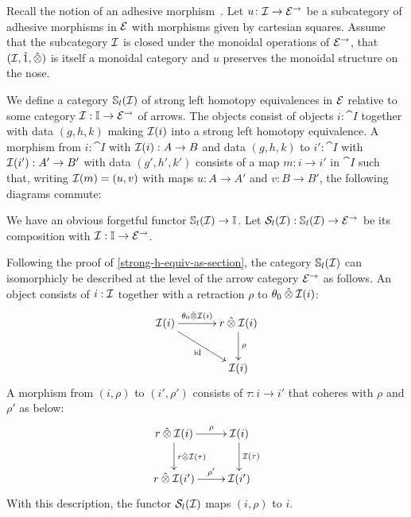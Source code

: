 \documentclass[reqno,10pt,a4paper,oneside]{amsart}
\begin{document}
Recall the notion of an adhesive morphism~\cite{garner-lack:adhesive}.  Let $u \co \cal{I} \to \catE^{\to}$ be a subcategory of adhesive morphisms in $\catE$ with morphisms given by cartesian squares. Assume that the subcategory $\cal{I}$ is closed under the monoidal operations of $\catE^{\to}$, \ie that $(\cal{I}, \hatunit, \hatotimes)$ is itself a monoidal category and $u$ preserves the monoidal structure on the nose. 

\newpage


\begin{definition}
We define a category $\cat{S}_l(\cal{I})$ of strong left homotopy equivalences in $\catE$ relative to some category $\cal{I} : \cat{I} \to \catE^{\to}$ of arrows.
The objects consist of objects $i : \cat{I}$ together with data $(g, h, k)$ making $\cal{I}(i)$ into a strong left homotopy equivalence.
A morphism from $i : \cat{I}$ with $\cal{I}(i) : A \to B$ and data $(g, h, k)$ to $i' : \cat{I}$ with $\cal{I}(i') : A' \to B'$ with data $(g', h', k')$ consists of a map $m : i \to i'$ in $\cat{I}$ such that, writing $\cal{I}(m) = (u, v)$ with maps $u : A \to A'$ and $v : B \to B'$, the following diagrams commute:

We have an obvious forgetful functor $\cat{S}_l(\cal{I}) \to \cat{I}$.
Let $\cal{S}_l(\cal{I}) : \cat{S}_l(\cal{I}) \to \catE^{\to}$ be its composition with $\cal{I} : \cat{I} \to \catE^{\to}$.
\end{definition}

\begin{remark}
\label{strong-h-equiv-as-section-algebraic}
Following the proof of \cref{strong-h-equiv-as-section}, the category $\cat{S}_l(\cal{I})$ can isomorphicly be described at the level of the arrow category $\catE^{\to}$ as follows.
An object consists of $i : \cal{I}$ together with a retraction $\rho$ to $\thetal \hatotimes \cal{I}(i)$:
\[
\xymatrix@C+1em{
  \cal{I}(i)
  \ar[r]^-{\thetal \hatotimes \cal{I}(i)}
  \ar[dr]_{\id}
&
  \intervalr \hatotimes \cal{I}(i) \ar[d]^{\rho}
\\&
  \cal{I}(i)
}
\]
A morphism from $(i, \rho)$ to $(i', \rho')$ consists of $\tau : i \to i'$ that coheres with $\rho$ and $\rho'$ as below:
\[
\xymatrix{
  \intervalr \hatotimes \cal{I}(i)
  \ar[r]^-{\rho}
  \ar[d]^{\intervalr \hatotimes \cal{I}(\tau)}
&
  \cal{I}(i)
  \ar[d]^{\cal{I}(\tau)}
\\
  \intervalr \hatotimes \cal{I}(i')
  \ar[r]^-{\rho'}
&
  \cal{I}(i')
}
\]
With this description, the functor $\cal{S}_l(\cal{I})$ maps $(i, \rho)$ to $i$.
\end{remark}
\end{document}
